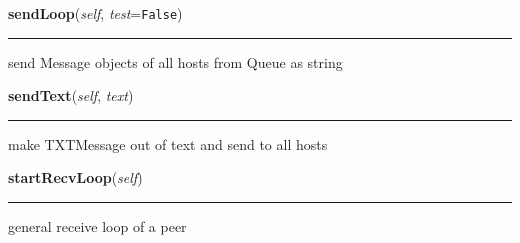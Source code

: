    \label{peer:Peer:sendLoop}

    \vspace{0.5ex}

\hspace{.8\funcindent}\begin{boxedminipage}{\funcwidth}

    \raggedright \textbf{sendLoop}(\textit{self}, \textit{test}={\tt False})

    \vspace{-1.5ex}

    \rule{\textwidth}{0.5\fboxrule}
\setlength{\parskip}{2ex}
    send Message objects of all hosts from Queue as string

\setlength{\parskip}{1ex}
    \end{boxedminipage}

    \label{peer:Peer:sendText}

    \vspace{0.5ex}

\hspace{.8\funcindent}\begin{boxedminipage}{\funcwidth}

    \raggedright \textbf{sendText}(\textit{self}, \textit{text})

    \vspace{-1.5ex}

    \rule{\textwidth}{0.5\fboxrule}
\setlength{\parskip}{2ex}
    make TXTMessage out of text and send to all hosts

\setlength{\parskip}{1ex}
    \end{boxedminipage}

    \label{peer:Peer:startRecvLoop}

    \vspace{0.5ex}

\hspace{.8\funcindent}\begin{boxedminipage}{\funcwidth}

    \raggedright \textbf{startRecvLoop}(\textit{self})

    \vspace{-1.5ex}

    \rule{\textwidth}{0.5\fboxrule}
\setlength{\parskip}{2ex}
    general receive loop of a peer

\setlength{\parskip}{1ex}
    \end{boxedminipage}

